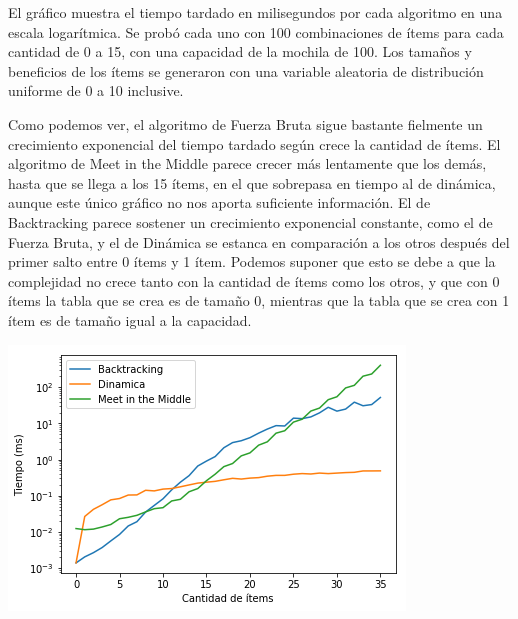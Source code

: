 \documentclass[10pt, a4paper]{article}
\begin{document}
El gráfico muestra el tiempo tardado en milisegundos por cada algoritmo en una escala logarítmica. Se probó cada uno con 100 combinaciones de ítems para cada cantidad de 0 a 15, con una capacidad de la mochila de 100. Los tamaños y beneficios de los ítems se generaron con una variable aleatoria de distribución uniforme de 0 a 10 inclusive.\par
Como podemos ver, el algoritmo de Fuerza Bruta sigue bastante fielmente un crecimiento exponencial del tiempo tardado según crece la cantidad de ítems. El algoritmo de Meet in the Middle parece crecer más lentamente que los demás, hasta que se llega a los 15 ítems, en el que sobrepasa en tiempo al de dinámica, aunque este único gráfico no nos aporta suficiente información. El de Backtracking parece sostener un crecimiento exponencial constante, como el de Fuerza Bruta, y el de Dinámica se estanca en comparación a los otros después del primer salto entre 0 ítems y 1 ítem. Podemos suponer que esto se debe a que la complejidad no crece tanto con la cantidad de ítems como los otros, y que con 0 ítems la tabla que se crea es de tamaño 0, mientras que la tabla que se crea con 1 ítem es de tamaño igual a la capacidad.\par

\includegraphics{capacidad100sinfuerza.png}
\end{document}
